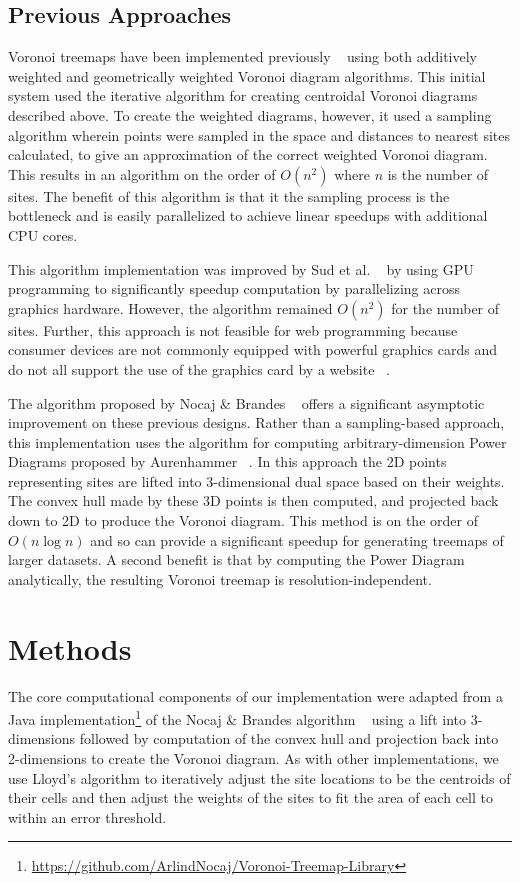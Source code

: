 \documentclass{acm_proc_article-sp} \usepackage{cite}
\begin{document}
\subsection{Previous Approaches}
Voronoi treemaps have been implemented previously
~\cite{balzer:treemaps} using both additively weighted and
geometrically weighted Voronoi diagram algorithms. This initial system
used the iterative algorithm for creating centroidal Voronoi
diagrams described above. To create the weighted diagrams, however, it
used a sampling algorithm wherein points were sampled in the space and
distances to nearest sites calculated, to give an approximation of the
correct weighted Voronoi diagram. This results in an algorithm on the
order of $O(n^2)$ where $n$ is the number of sites. The benefit of
this algorithm is that it the sampling process is the bottleneck and
is easily parallelized to achieve linear speedups with additional CPU
cores.

This algorithm implementation was improved by Sud et
al. ~\cite{sud:fast} by using GPU programming to significantly speedup
computation by parallelizing across graphics hardware. However, the
algorithm remained $O(n^2)$ for the number of sites. Further, this
approach is not feasible for web programming because consumer devices
are not commonly equipped with powerful graphics cards and do not all
support the use of the graphics card by a website ~\cite{needed}.

The algorithm proposed by Nocaj \& Brandes ~\cite{nocaj:faster} offers
a significant asymptotic improvement on these previous designs. Rather
than a sampling-based approach, this implementation uses the algorithm
for computing arbitrary-dimension Power Diagrams proposed by
Aurenhammer ~\cite{aurenhammer:power}. In this approach the 2D points
representing sites are lifted into 3-dimensional dual space based on
their weights. The convex hull made by these 3D points is then
computed, and projected back down to 2D to produce the Voronoi
diagram. This method is on the order of $O(n \log n)$ and so can
provide a significant speedup for generating treemaps of larger
datasets. A second benefit is that by computing the Power Diagram analytically,
the resulting Voronoi treemap is resolution-independent.

\section{Methods}
\label{sec:methods}
The core computational components of our implementation were adapted
from a Java implementation\footnote{\url{https://github.com/ArlindNocaj/Voronoi-Treemap-Library}}
 of the Nocaj \& Brandes algorithm
~\cite{nocaj:faster} using a lift into 3-dimensions followed by
computation of the convex hull and projection back into 2-dimensions
to create the Voronoi diagram. As with other implementations, we use
Lloyd's algorithm to iteratively adjust the site locations to be the
centroids of their cells and then adjust the weights of the sites to
fit the area of each cell to within an error threshold.
\end{document}

